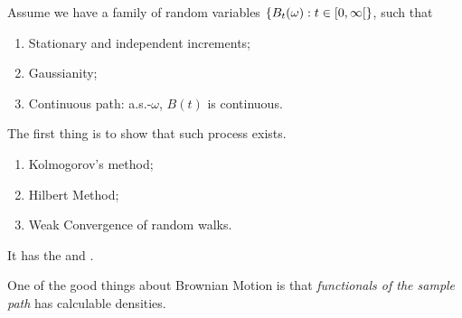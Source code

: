 Assume we have a family of random variables \(\Bqty{B_{t}(\omega): t \in \rinterval{0}{\infty}}\), such that 
\begin{enumerate}
    \item Stationary and independent increments;
    \item Gaussianity;
    \item Continuous path: a.s.-\(\omega\), \(B(t)\) is continuous.
\end{enumerate}

The first thing is to show that such process exists. 
\begin{enumerate}
    \item Kolmogorov's method;
    \item Hilbert Method;
    \item Weak Convergence of random walks. 
\end{enumerate}

It has the  and . 

One of the good things about Brownian Motion is that \textit{functionals of the sample path} has calculable densities. 

